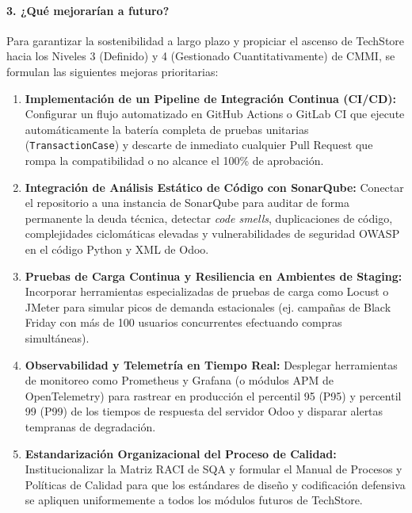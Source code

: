 \documentclass{article}
\begin{document}
\paragraph{3. ¿Qué mejorarían a futuro?}
Para garantizar la sostenibilidad a largo plazo y propiciar el ascenso de TechStore hacia los Niveles 3 (Definido) y 4 (Gestionado Cuantitativamente) de CMMI, se formulan las siguientes mejoras prioritarias:
\begin{enumerate}
    \item \textbf{Implementación de un Pipeline de Integración Continua (CI/CD):} Configurar un flujo automatizado en GitHub Actions o GitLab CI que ejecute automáticamente la batería completa de pruebas unitarias (\texttt{TransactionCase}) y descarte de inmediato cualquier Pull Request que rompa la compatibilidad o no alcance el 100\% de aprobación.
    \item \textbf{Integración de Análisis Estático de Código con SonarQube:} Conectar el repositorio a una instancia de SonarQube para auditar de forma permanente la deuda técnica, detectar \textit{code smells}, duplicaciones de código, complejidades ciclomáticas elevadas y vulnerabilidades de seguridad OWASP en el código Python y XML de Odoo.
    \item \textbf{Pruebas de Carga Continua y Resiliencia en Ambientes de Staging:} Incorporar herramientas especializadas de pruebas de carga como Locust o JMeter para simular picos de demanda estacionales (ej. campañas de Black Friday con más de 100 usuarios concurrentes efectuando compras simultáneas).
    \item \textbf{Observabilidad y Telemetría en Tiempo Real:} Desplegar herramientas de monitoreo como Prometheus y Grafana (o módulos APM de OpenTelemetry) para rastrear en producción el percentil 95 (P95) y percentil 99 (P99) de los tiempos de respuesta del servidor Odoo y disparar alertas tempranas de degradación.
    \item \textbf{Estandarización Organizacional del Proceso de Calidad:} Institucionalizar la Matriz RACI de SQA y formular el Manual de Procesos y Políticas de Calidad para que los estándares de diseño y codificación defensiva se apliquen uniformemente a todos los módulos futuros de TechStore.
\end{enumerate}
\end{document}
